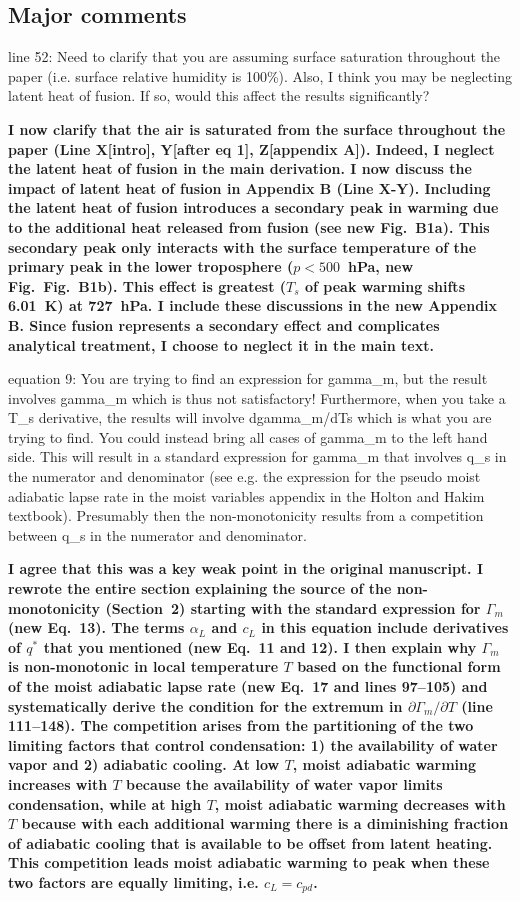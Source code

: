 \documentclass{article}
\begin{document}
\subsection{Major comments}
line 52: Need to clarify that you are assuming surface saturation throughout the paper (i.e. surface relative humidity is 100\%). Also, I think you may be neglecting latent heat of fusion. If so, would this affect the results significantly?
\par
\textbf{I now clarify that the air is saturated from the surface throughout the paper (Line X[intro], Y[after eq 1], Z[appendix A]). Indeed, I neglect the latent heat of fusion in the main derivation. I now discuss the impact of latent heat of fusion in Appendix B (Line X-Y). Including the latent heat of fusion introduces a secondary peak in warming due to the additional heat released from fusion (see new Fig.~B1a). This secondary peak only interacts with the surface temperature of the primary peak in the lower troposphere ($p<500$~hPa, new Fig.~Fig.~B1b). This effect is greatest ($T_s$ of peak warming shifts 6.01~K) at 727~hPa. I include these discussions in the new Appendix B. Since fusion represents a secondary effect and complicates analytical treatment, I choose to neglect it in the main text.}
\par
equation 9: You are trying to find an expression for gamma\_m, but the result involves gamma\_m which is thus not satisfactory! Furthermore, when you take a T\_s derivative, the results will involve dgamma\_m/dTs which is what you are trying to find. You could instead bring all cases of gamma\_m to the left hand side. This will result in a standard expression for gamma\_m that involves q\_s in the numerator and denominator (see e.g. the expression for the pseudo moist adiabatic lapse rate in the moist variables appendix in the Holton and Hakim textbook). Presumably then the non-monotonicity results from a competition between q\_s in the numerator and denominator.
\par
\textbf{I agree that this was a key weak point in the original manuscript. I rewrote the entire section explaining the source of the non-monotonicity (Section~2) starting with the standard expression for $\Gamma_m$ (new Eq.~13). The terms $\alpha_L$ and $c_L$ in this equation include derivatives of $q^*$ that you mentioned (new Eq.~11 and 12). I then explain why $\Gamma_m$ is non-monotonic in local temperature $T$ based on the functional form of the moist adiabatic lapse rate (new Eq.~17 and lines 97--105) and systematically derive the condition for the extremum in $\partial\Gamma_m/\partial T$ (line 111--148). The competition arises from the partitioning of the two limiting factors that control condensation: 1) the availability of water vapor and 2) adiabatic cooling. At low $T$, moist adiabatic warming increases with $T$ because the availability of water vapor limits condensation, while at high $T$, moist adiabatic warming decreases with $T$ because with each additional warming there is a diminishing fraction of adiabatic cooling that is available to be offset from latent heating. This competition leads moist adiabatic warming to peak when these two factors are equally limiting, i.e. $c_L = c_{pd}$.}
\end{document}
